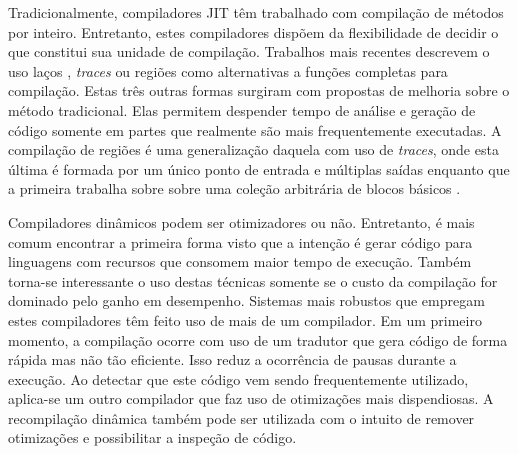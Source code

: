 Tradicionalmente, compiladores JIT têm trabalhado com compilação de métodos
por inteiro. Entretanto, estes compiladores
dispõem da flexibilidade de decidir o que constitui sua
unidade de compilação. Trabalhos mais recentes descrevem o uso laços
\cite{jitcompunits}, \textit{traces}
\cite{jitcompunits} ou regiões \cite{regionunit} como alternativas a
funções completas para compilação. Estas três outras formas surgiram
com propostas de melhoria \cite{regionunit}\cite{jitcompunits} sobre o
método tradicional. Elas permitem
despender tempo de análise e geração de código somente em partes que
realmente são mais
frequentemente executadas. A compilação de regiões é uma generalização
daquela com uso de \textit{traces}, onde esta última é formada
por um único ponto de entrada e múltiplas saídas \cite{jitcompunits}
enquanto que a primeira trabalha sobre sobre uma coleção arbitrária de
blocos básicos \cite{dragonbook}.

Compiladores dinâmicos podem ser otimizadores ou não. Entretanto, é
mais comum encontrar a primeira forma visto que a intenção é gerar
código para linguagens com recursos que consomem maior tempo de
execução. Também torna-se interessante o uso destas técnicas somente
se o custo da compilação for dominado pelo ganho em desempenho.
 Sistemas \cite{holzle}\cite{judo}\cite{suganuma_ibm} mais
robustos que empregam estes compiladores têm feito uso de mais de um
compilador. Em um primeiro momento, a compilação ocorre com uso de um
tradutor que gera código de forma rápida mas não tão eficiente. Isso
reduz a ocorrência de pausas durante a execução. Ao
detectar que este código vem sendo frequentemente utilizado,
aplica-se um outro compilador que faz uso de otimizações mais
dispendiosas. A recompilação dinâmica \cite{holzle} também pode ser
utilizada com o intuito de remover otimizações e possibilitar a inspeção
de código.





